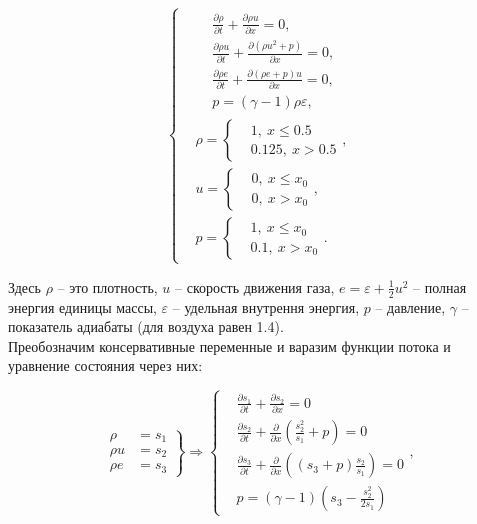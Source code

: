 \documentclass[12pt,a4paper]{article}
\begin{document}
		\begin{equation}
			\begin{cases}
				&\begin{split}
					&\frac{\partial \rho}{\partial t} + \frac{\partial \rho u}{\partial x} = 0, \\
					&\frac{\partial \rho u}{\partial t} + \frac{\partial \left( \rho u^{2} + p \right)}{\partial x} = 0, \\
					&\frac{\partial \rho e}{\partial t} + \frac{\partial \left( \rho e + p \right) u}{\partial x} = 0, \\
					&p = \left( \gamma - 1 \right) \rho \varepsilon,
				\end{split} \\
				&\rho =
					\begin{cases}
						&1, \: x \leq 0.5 \\
						&0.125, \: x > 0.5
					\end{cases}, \\
				&u =
					\begin{cases}
						&0, \: x \leq x_{0} \\
						&0, \: x > x_{0}
					\end{cases}, \\
				&p =
					\begin{cases}
						&1, \: x \leq x_{0} \\
						&0.1, \: x > x_{0}
					\end{cases}.
			\end{cases}
		\end{equation}

		Здесь $\rho$ -- это плотность, $u$ -- скорость движения газа, $e = \varepsilon + \frac{1}{2} u^{2}$ -- полная энергия единицы массы, $\varepsilon$ -- удельная внутрення энергия, $p$ -- давление, $\gamma$ -- показатель адиабаты (для воздуха равен 1.4).\\

		Преобозначим консервативные переменные и варазим функции потока и уравнение состояния через них:
	
		\begin{equation}
			\left.
				\begin{split}
					\rho &= s_{1} \\
					\rho u &= s_{2} \\
					\rho e &= s_3
				\end{split}
			\right\rbrace
			\Rightarrow
			\left\lbrace
				\begin{split}
					&\frac{\partial s_{1}}{\partial t} + \frac{\partial s_{2}}{\partial x} = 0 \\
					&\frac{\partial s_{2}}{\partial t} + \frac{\partial}{\partial x} \left( \frac{s^{2}_{2}}{s_{1}} + p \right) = 0 \\
					&\frac{\partial s_{3}}{\partial t} + \frac{\partial}{\partial x} \left( \left( s_{3} + p \right) \frac{s_{2}}{s_{1}} \right) = 0 \\
					&p = \left( \gamma - 1 \right) \left( s_{3} - \frac{s^{2}_{2}}{2 s_{1}} \right)
				\end{split}
			\right. ,
		\end{equation}
\end{document}
